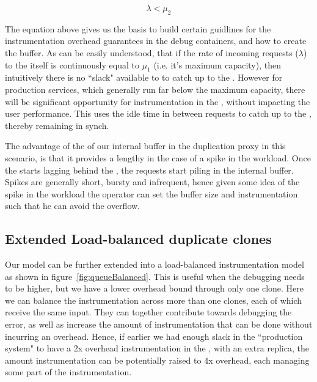 \begin{equation}\label{eq:four}
  \lambda < \mu_{2}
\end{equation}

The equation above gives us the basis to build certain guidlines for the instrumentation overhead guarantees in the debug containers, and how to create the buffer. 
As can be easily understood, that if the rate of incoming requests ($\lambda$) to the \productioncontainer itself is continuously equal to $\mu_{1}$ (i.e. it's maximum capacity), then intuitively there is no ``slack" available to \debugcontainer to catch up to the \productioncontainer. 
However for production services, which generally run far below the maximum capacity, there will be significant opportunity for instrumentation in the \debugcontainer, without impacting the user performance.
This \debugcontainer uses the idle time in between requests to catch up to the \productioncontainer, thereby remaining in synch.

The advantage of the of our internal buffer in the duplication proxy in this scenario, is that it provides a lengthy \debugwindow in the case of a spike in the workload.
Once the \debugcontainer starts lagging behind the \productioncontainer, the requests start piling in the internal buffer. 
Spikes are generally short, bursty and infrequent, hence given some idea of the spike in the workload the operator can set the buffer size and instrumentation such that he can avoid the overflow.


\subsection{Extended Load-balanced duplicate clones}

Our model can be further extended into a load-balanced instrumentation model as shown in figure~\ref{fig:queueBalanced}. 
This is useful when the debugging needs to be higher, but we have a lower overhead bound through only one clone.
Here we can balance the instrumentation across more than one clones, each of which receive the same input.
They can together contribute towards debugging the error, as well as increase the amount of instrumentation that can be done without incurring an overhead.
Hence, if earlier we had enough slack in the ``production system" to have a 2x overhead instrumentation in the \debugcontainer, with an extra replica, the amount instrumentation can be potentially raised to 4x overhead, each managing some part of the instrumentation.

